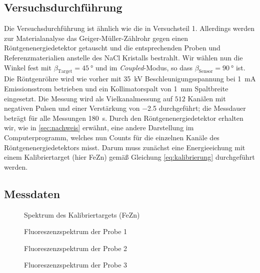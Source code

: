 \documentclass[11pt, a4paper]{article}
\begin{document}
\subsection{Versuchsdurchführung}
Die Versuchsdurchführung ist ähnlich wie die in Versuchsteil 1.
Allerdings werden zur Materialanalyse das Geiger-Müller-Zählrohr gegen einen Röntgenenergiedetektor getauscht und die entsprechenden Proben und Referenzmaterialien anstelle des NaCl Kristalls bestrahlt.
Wir wählen nun die Winkel fest mit $\beta_\mathrm{Target}=\SI{45}{\degree}$ und im \emph{Coupled}-Modus, so dass $\beta_\mathrm{Sensor} = \SI{90}{\degree}$ ist.
Die Röntgenröhre wird wie vorher mit \SI{35}{\kilo\volt} Beschleunigungsspannung bei \SI{1}{\milli\ampere} Emissionsstrom betrieben und ein Kollimatorspalt von \SI{1}{\milli\metre} Spaltbreite eingesetzt.
Die Messung wird als Vielkanalmessung auf $512$ Kanälen mit negativen Pulsen und einer Verstärkung von \num{-2.5} durchgeführt; die Messdauer beträgt für alle Messungen \SI{180}{\second}.
Durch den Röntgenenergiedetektor erhalten wir, wie in \ref{sec:nachweis} erwähnt, eine andere Darstellung im Computerprogramm, welches nun Counts für die einzelnen Kanäle des Röntgenenergiedetektors misst. Darum muss zunächst eine Energieeichung mit einem Kalibriertarget (hier FeZn) gemäß Gleichung \ref{eq:kalibrierung} durchgeführt werden.

\newpage
\subsection{Messdaten}
\FloatBarrier
\begin{figure}[!h]
\centering

\caption{Spektrum des Kalibriertargets (FeZn)}
\label{fig:kalibrierung}
\end{figure}

\begin{figure}[!h]
\centering

\caption{Fluoreszenzspektrum der Probe 1}
\label{fig:probe1}
\end{figure}

\begin{figure}[!h]
\centering

\caption{Fluoreszenzspektrum der Probe 2}
\label{fig:probe2}
\end{figure}

\begin{figure}[!h]
\centering

\caption{Fluoreszenzspektrum der Probe 3}
\label{fig:probe3}
\end{figure}
\end{document}
